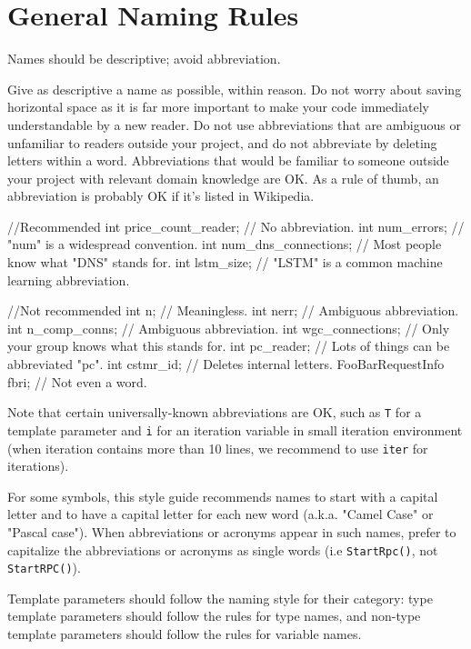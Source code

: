 \documentclass[12pt,reqno]{book}      %
\begin{document}
\section{General Naming Rules}
Names should be descriptive; avoid abbreviation.

Give as descriptive a name as possible, within reason. Do not worry about saving horizontal space as it is far more important to make your code immediately understandable by a new reader. Do not use abbreviations that are ambiguous or unfamiliar to readers outside your project, and do not abbreviate by deleting letters within a word. Abbreviations that would be familiar to someone outside your project with relevant domain knowledge are OK. As a rule of thumb, an abbreviation is probably OK if it's listed in Wikipedia.

\begin{Code}
//Recommended
int price_count_reader;    // No abbreviation.
int num_errors;            // "num" is a widespread convention.
int num_dns_connections;   // Most people know what "DNS" stands for.
int lstm_size;             // "LSTM" is a common machine learning abbreviation.	
\end{Code}

\begin{Code}
//Not recommended
int n;                     // Meaningless.
int nerr;                  // Ambiguous abbreviation.
int n_comp_conns;          // Ambiguous abbreviation.
int wgc_connections;       // Only your group knows what this stands for.
int pc_reader;             // Lots of things can be abbreviated "pc".
int cstmr_id;              // Deletes internal letters.
FooBarRequestInfo fbri;    // Not even a word.	
\end{Code}	

Note that certain universally-known abbreviations are OK, such as \texttt{T} for a template parameter and \texttt{i} for an iteration variable in small iteration environment (when iteration contains more than 10 lines, we recommend to use \texttt{iter} for iterations). 

For some symbols, this style guide recommends names to start with a capital letter and to have a capital letter for each new word (a.k.a. "Camel Case" or "Pascal case"). When abbreviations or acronyms appear in such names, prefer to capitalize the abbreviations or acronyms as single words (i.e \texttt{StartRpc()}, not \texttt{StartRPC()}).

Template parameters should follow the naming style for their category: type template parameters should follow the rules for type names, and non-type template parameters should follow the rules for variable names.
\end{document}

